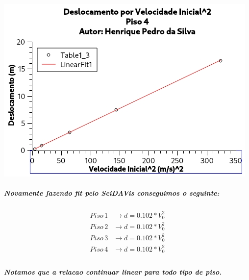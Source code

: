 \documentclass[12pt,twoside, a4paper, twocolumn]{article}
\begin{document}
\begin{adjustbox}{scale=0.75}
    \includegraphics{Grafico-4.jpg}
\end{adjustbox}

\subparagraph*{Novamente fazendo \emph{fit} pelo SciDAVis conseguimos o seguinte:}

\begin{equation}
    \begin{aligned}
        Piso\, 1 & \rightarrow d = 0.102 * V_0^2 \\
        Piso\, 2 & \rightarrow d = 0.102 * V_0^2 \\
        Piso\, 3 & \rightarrow d = 0.102 * V_0^2 \\
        Piso\, 4 & \rightarrow d = 0.102 * V_0^2 \\
    \end{aligned}
\end{equation}

\subparagraph*{Notamos que a relacao continuar linear para todo tipo de piso.}


\paragraph*{\\ \\ \\ \\ \\ \\ \\ }
\end{document}
